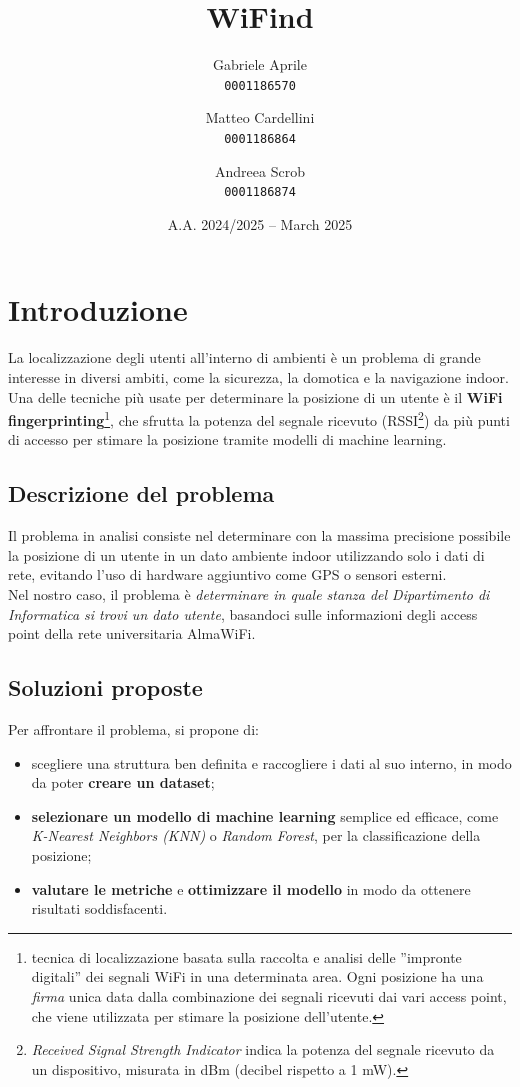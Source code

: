 \documentclass{article}
\title{{\myfont WiFind}}
\author{
    Gabriele Aprile\\
    \texttt{0001186570}
    \and
    Matteo Cardellini\\
    \texttt{0001186864}
    \and
    Andreea Scrob\\
    \texttt{0001186874}
}
\date{A.A. 2024/2025 -- March 2025}
\begin{document}
\maketitle

\begingroup
\hypersetup{hidelinks} 
\tableofcontents
\endgroup

\newpage

\section{Introduzione}
La localizzazione degli utenti all'interno di ambienti è un problema di grande interesse in diversi ambiti, come la sicurezza, la domotica e la navigazione indoor. Una delle tecniche più usate per determinare la posizione di un utente è il \textbf{WiFi fingerprinting}\footnote{tecnica di localizzazione basata sulla raccolta e analisi delle ''impronte digitali'' dei segnali WiFi in una determinata area. Ogni posizione ha una \textit{firma} unica data dalla combinazione dei segnali ricevuti dai vari access point, che viene utilizzata per stimare la posizione dell'utente.}, che sfrutta la potenza del segnale ricevuto (RSSI\footnote{\textit{Received Signal Strength Indicator} indica la potenza del segnale ricevuto da un dispositivo, misurata in dBm (decibel rispetto a 1 mW).}) da più punti di accesso per stimare la posizione tramite modelli di machine learning.

\subsection{Descrizione del problema}
Il problema in analisi consiste nel determinare con la massima precisione possibile la posizione di un utente in un dato ambiente indoor utilizzando solo i dati di rete, evitando l'uso di hardware aggiuntivo come GPS o sensori esterni. \\

Nel nostro caso, il problema è \textit{determinare in quale stanza del Dipartimento di Informatica si trovi un dato utente}, basandoci sulle informazioni degli access point della rete universitaria AlmaWiFi.

\subsection{Soluzioni proposte}
Per affrontare il problema, si propone di:
\begin{itemize}
    \item scegliere una struttura ben definita e raccogliere i dati al suo interno, in modo da poter \textbf{creare un dataset};
    \item \textbf{selezionare un modello di machine learning} semplice ed efficace, come \textit{K-Nearest Neighbors (KNN)} o \textit{Random Forest}, per la classificazione della posizione;
    \item \textbf{valutare le metriche} e \textbf{ottimizzare il modello} in modo da ottenere risultati soddisfacenti.
\end{itemize}
\end{document}
